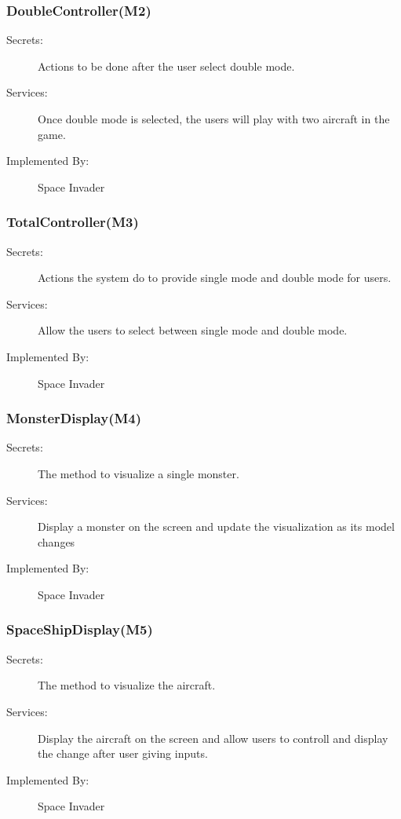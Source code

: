 \documentclass[12pt]{article}
\begin{document}
\subsubsection{DoubleController(M2)}

\begin{description}
\item[Secrets:]Actions to be done after the user select double mode.
\item[Services:]Once double mode is selected, the users will play with two aircraft in the game.
\item[Implemented By:] Space Invader
\end{description}

\subsubsection{TotalController(M3)}
\begin{description}
\item[Secrets:] Actions the system do to provide single mode and double mode for users.
\item[Services:] Allow the users to select between single mode and double mode.
\item[Implemented By:] Space Invader
\end{description}

\subsubsection{MonsterDisplay(M4)}
\begin{description}
\item[Secrets:] The method to visualize a single monster.
\item[Services:] Display a monster on the screen and update the visualization as its model changes
\item[Implemented By:] Space Invader
\end{description}

\subsubsection{SpaceShipDisplay(M5)}
\begin{description}
\item[Secrets:] The method to visualize the aircraft.
\item[Services:] Display the aircraft on the screen and allow users to controll and display the change after user giving inputs.
\item[Implemented By:] Space Invader
\end{description}
\end{document}
